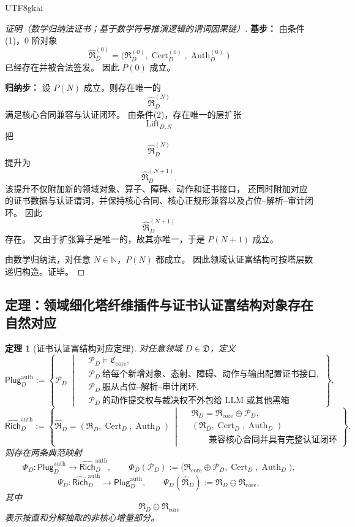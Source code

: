 \documentclass[12pt]{article}
\newtheorem{theorem}{定理}[section]
\newcommand{\NN}{\mathbb{N}}
\newcommand{\Cert}{\operatorname{Cert}}
\newcommand{\Auth}{\operatorname{Auth}}
\begin{document}
\begin{CJK*}{UTF8}{gkai}
\begin{proof}[证明（数学归纳法证书；基于数学符号推演逻辑的谓词因果链）]
\textbf{基步：}
由条件(1)，$0$ 阶对象
\[
  \widehat{\mathfrak R}_D^{(0)}
  =
  \bigl(
    \mathfrak R_D^{(0)},
    \Cert_D^{(0)},
    \Auth_D^{(0)}
  \bigr)
\]
已经存在并被合法签发。
因此 $P(0)$ 成立。

\textbf{归纳步：}
设 $P(N)$ 成立，则存在唯一的
\[
  \widehat{\mathfrak R}_D^{(N)}
\]
满足核心合同兼容与认证闭环。
由条件(2)，存在唯一的层扩张
\[
  \operatorname{Lift}_{D,N}
\]
把
\[
  \widehat{\mathfrak R}_D^{(N)}
\]
提升为
\[
  \widehat{\mathfrak R}_D^{(N+1)}.
\]
该提升不仅附加新的领域对象、算子、障碍、动作和证书接口，
还同时附加对应的证书数据与认证谓词，并保持核心合同、核心正规形兼容以及占位--解析--审计闭环。
因此
\[
  \widehat{\mathfrak R}_D^{(N+1)}
\]
存在。
又由于扩张算子是唯一的，故其亦唯一，于是 $P(N+1)$ 成立。

由数学归纳法，对任意 $N\in\NN$，$P(N)$ 都成立。
因此领域认证富结构可按塔层数递归构造。证毕。
\end{proof}

\subsection{定理：领域细化塔纤维插件与证书认证富结构对象存在自然对应}
\label{subsec:tex37-ch8-theorem}

\begin{theorem}[证书认证富结构对应定理]
\label{thm:tex37-ch8-correspondence}
对任意领域 $D\in\mathfrak D$，定义
\[
  \mathsf{Plug}_D^{\mathrm{auth}}
  :=
  \left\{
    \mathcal P_D\
    \middle|\
    \begin{aligned}
      &\mathcal P_D\models \mathfrak C_{\mathrm{core}},\\
      &\mathcal P_D\ \text{给每个新增对象、态射、障碍、动作与输出配置证书接口},\\
      &\mathcal P_D\ \text{服从占位--解析--审计闭环},\\
      &\mathcal P_D\ \text{的动作提交权与裁决权不外包给 LLM 或其他黑箱}
    \end{aligned}
  \right\},
\]
\[
  \widehat{\mathsf{Rich}}_D^{\mathrm{auth}}
  :=
  \left\{
    \widehat{\mathfrak R}_D=(\mathfrak R_D,\Cert_D,\Auth_D)\
    \middle|\
    \begin{aligned}
      &\mathfrak R_D=\mathfrak R_{\mathrm{core}}\oplus \mathcal P_D,\\
      &(\mathfrak R_D,\Cert_D,\Auth_D)\\
      &\qquad \text{兼容核心合同并具有完整认证闭环}
    \end{aligned}
  \right\}.
\]
则存在两条典范映射
\[
  \Phi_D:
  \mathsf{Plug}_D^{\mathrm{auth}}
  \to
  \widehat{\mathsf{Rich}}_D^{\mathrm{auth}},
  \qquad
  \Phi_D(\mathcal P_D)
  :=
  \bigl(
    \mathfrak R_{\mathrm{core}}\oplus \mathcal P_D,\Cert_D,\Auth_D
  \bigr),
\]
\[
  \Psi_D:
  \widehat{\mathsf{Rich}}_D^{\mathrm{auth}}
  \to
  \mathsf{Plug}_D^{\mathrm{auth}},
  \qquad
  \Psi_D(\widehat{\mathfrak R}_D)
  :=
  \mathfrak R_D\ominus \mathfrak R_{\mathrm{core}},
\]
其中
\[
  \mathfrak R_D\ominus \mathfrak R_{\mathrm{core}}
\]
表示按直和分解抽取的非核心增量部分。


\end{theorem}
\end{CJK*}
\end{document}

